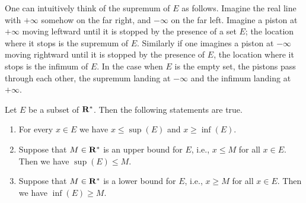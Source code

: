 \begin{note}
    One can intuitively think of the supremum of \(E\) as follows.
    Imagine the real line with \(+\infty\) somehow on the far right, and \(-\infty\) on the far left.
    Imagine a piston at \(+\infty\) moving leftward until it is stopped by the presence of a set \(E\);
    the location where it stops is the supremum of \(E\).
    Similarly if one imagines a piston at \(-\infty\) moving rightward until it is stopped by the presence of \(E\), the location where it stops is the infimum of \(E\).
    In the case when \(E\) is the empty set, the pistons pass through each other, the supremum landing at \(-\infty\) and the infimum landing at \(+\infty\).
\end{note}

\begin{theorem}\label{6.2.11}
    Let \(E\) be a subset of \(\mathbf{R}^*\).
    Then the following statements are true.
    \begin{enumerate}
        \item For every \(x \in E\) we have \(x \leq \sup(E)\) and \(x \geq \inf(E)\).
        \item Suppose that \(M \in \mathbf{R}^*\) is an upper bound for \(E\), i.e., \(x \leq M\) for all \(x \in E\).
              Then we have \(\sup(E) \leq M\).
        \item Suppose that \(M \in \mathbf{R}^*\) is a lower bound for \(E\), i.e., \(x \geq M\) for all \(x \in E\).
              Then we have \(\inf(E) \geq M\).
    \end{enumerate}
\end{theorem}

